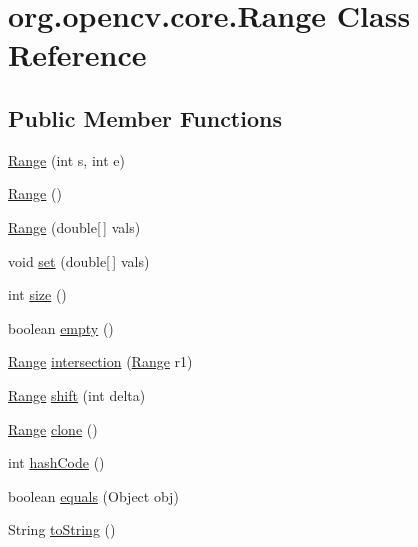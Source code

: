 \hypertarget{classorg_1_1opencv_1_1core_1_1_range}{}\section{org.\+opencv.\+core.\+Range Class Reference}
\label{classorg_1_1opencv_1_1core_1_1_range}
\subsection*{Public Member Functions}
\begin{DoxyCompactItemize}
\item 
\mbox{\hyperlink{classorg_1_1opencv_1_1core_1_1_range_a1089f14e7fa40016a6cbd17991c2dae4}{Range}} (int s, int e)
\item 
\mbox{\hyperlink{classorg_1_1opencv_1_1core_1_1_range_a9f31905b8ce03ab215e5a9fbefb69fb0}{Range}} ()
\item 
\mbox{\hyperlink{classorg_1_1opencv_1_1core_1_1_range_a9f49af680d1e21fb48822a996763c13c}{Range}} (double\mbox{[}$\,$\mbox{]} vals)
\item 
void \mbox{\hyperlink{classorg_1_1opencv_1_1core_1_1_range_a7ac5b704800aa60dccd49d6aace060c4}{set}} (double\mbox{[}$\,$\mbox{]} vals)
\item 
int \mbox{\hyperlink{classorg_1_1opencv_1_1core_1_1_range_a07e501f7d563301c3102bf119b9c9d48}{size}} ()
\item 
boolean \mbox{\hyperlink{classorg_1_1opencv_1_1core_1_1_range_a55a75bcfc883b7c46d789e6f42b6d8ed}{empty}} ()
\item 
\mbox{\hyperlink{classorg_1_1opencv_1_1core_1_1_range}{Range}} \mbox{\hyperlink{classorg_1_1opencv_1_1core_1_1_range_a01210a548b2bd66cdede08f42459b129}{intersection}} (\mbox{\hyperlink{classorg_1_1opencv_1_1core_1_1_range}{Range}} r1)
\item 
\mbox{\hyperlink{classorg_1_1opencv_1_1core_1_1_range}{Range}} \mbox{\hyperlink{classorg_1_1opencv_1_1core_1_1_range_a3aaebb51d9bfc18cd8dcce1a7252e898}{shift}} (int delta)
\item 
\mbox{\hyperlink{classorg_1_1opencv_1_1core_1_1_range}{Range}} \mbox{\hyperlink{classorg_1_1opencv_1_1core_1_1_range_a6a7a79f6fd9119be153b79f3d97c900a}{clone}} ()
\item 
int \mbox{\hyperlink{classorg_1_1opencv_1_1core_1_1_range_a23c0f048ccc10b8adaec877948d9d398}{hash\+Code}} ()
\item 
boolean \mbox{\hyperlink{classorg_1_1opencv_1_1core_1_1_range_ab8c1038aec09a58d5a28bc3b4af1da6b}{equals}} (Object obj)
\item 
String \mbox{\hyperlink{classorg_1_1opencv_1_1core_1_1_range_a4be73b3a1ad9cc1e29149cdb5037993c}{to\+String}} ()
\end{DoxyCompactItemize}
